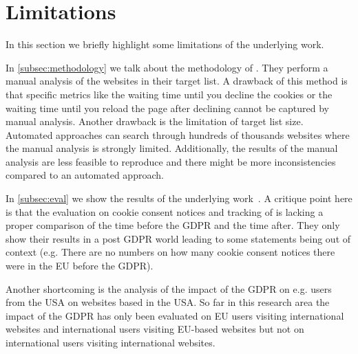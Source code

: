 \section{Limitations}
\label{sec:limitations}

In this section we briefly highlight some limitations of the underlying work.

In \autoref{subsec:methodology} we talk about the methodology of . They perform a manual analysis of
the websites in their target list. A drawback of this method is that specific metrics like the waiting time until you
decline the cookies or the waiting time until you reload the page after declining cannot be captured by manual analysis.
Another drawback is the limitation of target list size. Automated approaches can search through hundreds of thousands
websites where the manual analysis is strongly limited. Additionally, the results of the manual analysis are less
feasible to reproduce and there might be more inconsistencies compared to an automated approach.

In \autoref{subsec:eval} we show the results of the underlying work~\cite{sanchez2019can}.
A critique point here is that the evaluation on cookie consent notices and tracking of \citeauthor{sanchez2019can}
is lacking a proper comparison of the time before
the GDPR and the time after. They only show their results in a post GDPR world leading to some statements being out of
context (e.g. There are no numbers on how many cookie consent notices there were in the EU before the GDPR).

Another shortcoming is the analysis of the impact of the GDPR on e.g. users from the USA on websites based in
the USA. So far in this research area the impact of the GDPR has only been evaluated on EU users visiting international websites and
international users visiting EU-based websites but not on international users visiting international websites.

